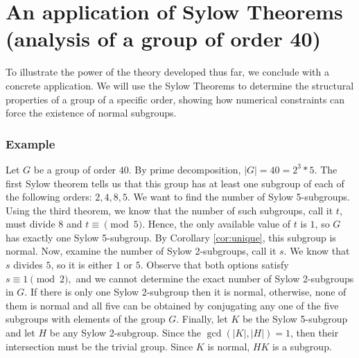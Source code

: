 \documentclass[a4paper,12pt]{article}
\begin{document}
\section{An application of Sylow Theorems (analysis of a group of order 40)}
To illustrate the power of the theory developed thus far, we conclude with a concrete application. We will use the Sylow Theorems to determine the structural properties of a group of a specific order, showing how numerical constraints can force the existence of normal subgroups.
\subsubsection*{Example}
Let $G$ be a group of order $40$. By prime decomposition, $|G|=40=2^3 * 5.$ The first Sylow theorem tells us that this group has at least one subgroup of each of the following orders: $2,4,8,5.$
We want to find the number of Sylow 5-subgroups. Using the third theorem, we know that the number of such subgroups, call it $t$, must divide $8$ and $t \equiv \pmod 5.$ Hence, the only available value of $t$ is $1$, so $G$ has exactly one Sylow 5-subgroup. By Corollary \ref{cor:unique}, this subgroup is normal. Now, examine the number of Sylow 2-subgroups, call it $s$. We know that $s$ divides $5$, so it is either $1$ or $5.$ Observe that both options satisfy $s \equiv 1 \pmod 2,$ and we cannot determine the exact number of Sylow 2-subgroups in $G.$ If there is only one Sylow 2-subgroup then it is normal, otherwise, none of them is normal and all five can be obtained by conjugating any one of the five subgroups with elements of the group $G$.
Finally, let $K$ be the Sylow 5-subgroup and let $H$ be any Sylow 2-subgroup. Since the $\operatorname{gcd}(|K|,|H|)=1$, then their intersection must be the trivial group. Since $K$ is normal, $HK$ is a subgroup. 
\end{document}
